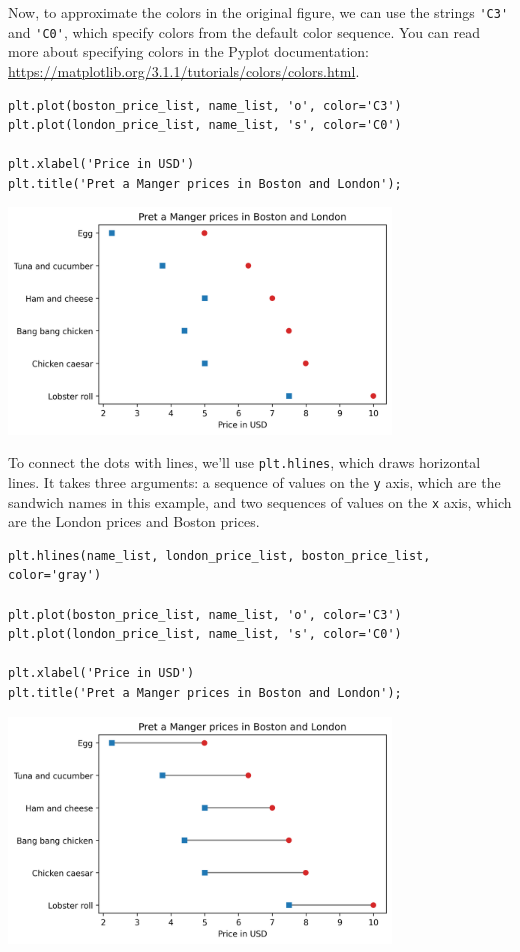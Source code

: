 Now, to approximate the colors in the original figure, we can use the
strings \passthrough{\lstinline!'C3'!} and
\passthrough{\lstinline!'C0'!}, which specify colors from the default
color sequence. You can read more about specifying colors in the Pyplot
documentation:
\url{https://matplotlib.org/3.1.1/tutorials/colors/colors.html}.

\begin{lstlisting}[]
plt.plot(boston_price_list, name_list, 'o', color='C3')
plt.plot(london_price_list, name_list, 's', color='C0')

plt.xlabel('Price in USD')
plt.title('Pret a Manger prices in Boston and London');
\end{lstlisting}

\begin{center}
\includegraphics[width=4in]{chapters/06_plotting_files/06_plotting_44_0.png}
\end{center}

To connect the dots with lines, we'll use
\passthrough{\lstinline!plt.hlines!}, which draws horizontal lines. It
takes three arguments: a sequence of values on the
\passthrough{\lstinline!y!} axis, which are the sandwich names in this
example, and two sequences of values on the \passthrough{\lstinline!x!}
axis, which are the London prices and Boston prices.

\begin{lstlisting}[]
plt.hlines(name_list, london_price_list, boston_price_list, color='gray')

plt.plot(boston_price_list, name_list, 'o', color='C3')
plt.plot(london_price_list, name_list, 's', color='C0')

plt.xlabel('Price in USD')
plt.title('Pret a Manger prices in Boston and London');
\end{lstlisting}

\begin{center}
\includegraphics[width=4in]{chapters/06_plotting_files/06_plotting_46_0.png}
\end{center}

